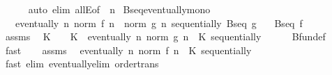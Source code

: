 \begin{isabellebody}
\ \ \ \ \isamarkupfalse%
\ {\isacharparenleft}{\kern0pt}auto\ elim{\isacharbang}{\kern0pt}{\isacharcolon}{\kern0pt}\ allE{\isacharbrackleft}{\kern0pt}of\ {\isacharunderscore}{\kern0pt}\ n{\isacharbrackright}{\kern0pt}{\isacharparenright}{\kern0pt}\isanewline
{}\isamarkupfalse%
%
\endisatagproof
{\isafoldproof}%
%
\isadelimproof
\isanewline
%
\endisadelimproof
\isanewline
{}\isamarkupfalse%
\ Bseq{\isacharunderscore}{\kern0pt}eventually{\isacharunderscore}{\kern0pt}mono{\isacharcolon}{\kern0pt}\isanewline
\ \ \ {\isachardoublequoteopen}eventually\ {\isacharparenleft}{\kern0pt}{\isasymlambda}n{\isachardot}{\kern0pt}\ norm\ {\isacharparenleft}{\kern0pt}f\ n{\isacharparenright}{\kern0pt}\ {\isasymle}\ norm\ {\isacharparenleft}{\kern0pt}g\ n{\isacharparenright}{\kern0pt}{\isacharparenright}{\kern0pt}\ sequentially{\isachardoublequoteclose}\ {\isachardoublequoteopen}Bseq\ g{\isachardoublequoteclose}\isanewline
\ \ \ {\isachardoublequoteopen}Bseq\ f{\isachardoublequoteclose}\isanewline
%
\isadelimproof
%
\endisadelimproof
%
\isatagproof
{}\isamarkupfalse%
\ {\isacharminus}{\kern0pt}\isanewline
\ \ \isamarkupfalse%
\ assms{\isacharparenleft}{\kern0pt}{}{\isacharparenright}{\kern0pt}\ \isamarkupfalse%
\ K\ \ {\isachardoublequoteopen}{}\ {\isacharless}{\kern0pt}\ K{\isachardoublequoteclose}\ \ {\isachardoublequoteopen}eventually\ {\isacharparenleft}{\kern0pt}{\isasymlambda}n{\isachardot}{\kern0pt}\ norm\ {\isacharparenleft}{\kern0pt}g\ n{\isacharparenright}{\kern0pt}\ {\isasymle}\ K{\isacharparenright}{\kern0pt}\ sequentially{\isachardoublequoteclose}\isanewline
\ \ \ \ \isamarkupfalse%
\ Bfun{\isacharunderscore}{\kern0pt}def\ \isamarkupfalse%
\ fast\isanewline
\ \ \isamarkupfalse%
\ assms{\isacharparenleft}{\kern0pt}{}{\isacharparenright}{\kern0pt}\ \isamarkupfalse%
\ {\isachardoublequoteopen}eventually\ {\isacharparenleft}{\kern0pt}{\isasymlambda}n{\isachardot}{\kern0pt}\ norm\ {\isacharparenleft}{\kern0pt}f\ n{\isacharparenright}{\kern0pt}\ {\isasymle}\ K{\isacharparenright}{\kern0pt}\ sequentially{\isachardoublequoteclose}\isanewline
\ \ \ \ \isamarkupfalse%
\ {\isacharparenleft}{\kern0pt}fast\ elim{\isacharcolon}{\kern0pt}\ eventually{\isacharunderscore}{\kern0pt}elim{}\ order{\isacharunderscore}{\kern0pt}trans{\isacharparenright}{\kern0pt}\isanewline
\ \ \isamarkupfalse%

\end{isabellebody}
